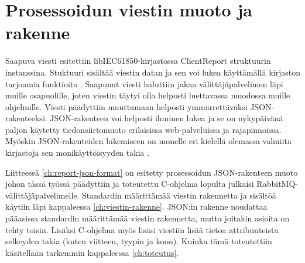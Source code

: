 \section{Prosessoidun viestin muoto ja rakenne}
Saapuva viesti esitettiin libIEC61850-kirjastossa ClientReport struktuurin instanssina. Stuktuuri sisältää viestin datan ja sen voi lukea käyttämällä kirjaston tarjoamia funktioita \mbox{\cite{libIEC61850-doc}}. Saapunut viesti haluttiin jakaa välittäjäpalvelimen läpi muille osapuolille, joten viestin täytyi olla helposti luettavassa muodossa muille ohjelmille. Viesti päädyttiin muuttamaan helposti ymmärrettäväksi JSON-rakenteeksi. JSON-rakenteen voi helposti ihminen lukea ja se on nykypäivänä paljon käytetty tiedonsiirtomuoto erilaisissa web-palveluissa ja rajapinnoissa. Myöskin JSON-rakenteiden lukemiseen on monelle eri kielellä olemassa valmiita kirjastoja sen monikäyttöisyyden takia \mbox{\cite{Patrizio2016}}.

Liitteessä \ref{ch:report-json-format} on esitetty prosessoidun JSON-rakenteen muoto johon tässä työssä päädyttiin ja toteutettu C-ohjelma lopulta julkaisi RabbitMQ-välittäjäpalvelimelle. Standardin määrittämää viestin rakennetta ja sisältöä käytiin läpi kappaleessa \ref{ch:viestin-rakenne}. JSON:in rakenne noudattaa pääasissa standardin määrittämää viestin rakennetta, mutta joitakin asioita on tehty toisin. Lisäksi C-ohjelma myös lisäsi viestiin lisää tietoa attribuuteista selkeyden takia (kuten viitteen, tyypin ja koon). Kuinka tämä toteutettiin käsitellään tarkemmin kappaleessa \ref{ch:toteutus}.

